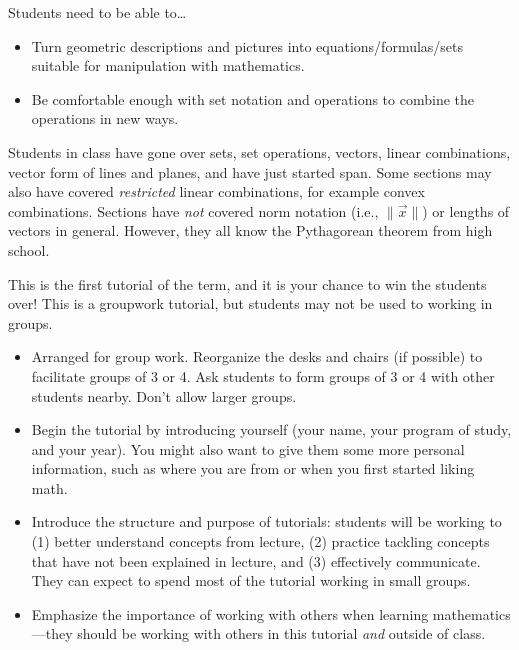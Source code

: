 		 Students need to be able to\ldots
		\begin{itemize}
			\item Turn geometric descriptions and pictures into equations/formulas/sets
				suitable for manipulation with mathematics.

			\item Be comfortable enough with set notation and operations to combine
				the operations in new ways.
		\end{itemize}


		 Students in class have gone over sets, set operations,
		vectors, linear combinations, vector form of lines and planes, and have just started
		span. Some sections may also have covered \emph{restricted} linear combinations, for example
		convex combinations. Sections have \emph{not} covered norm notation (i.e., $\|\vec x\|$) or
		lengths of vectors in general. However, they all know the Pythagorean theorem from high school.


		 This is the first tutorial of the term, and
		it is your chance to win the students over! This is a groupwork tutorial,
		but students may not be used to working in groups.

		\begin{itemize}
			\item Arranged for group work. Reorganize the desks and chairs
				(if possible) to facilitate groups of 3 or 4. Ask
				students to form groups of 3 or 4 with other students
				nearby. Don't allow larger groups.

			\item Begin the tutorial by introducing yourself (your name,
				your program of study, and your year). You might
				also want to give them some more personal information,
				such as where you are from or when you first started liking math.

			\item Introduce the structure and purpose of tutorials: students
				will be working to (1) better understand concepts
				from lecture, (2) practice tackling concepts that
				have not been explained in lecture, and (3) effectively
				communicate. They can expect to spend most of the
				tutorial working in small groups.

			\item Emphasize the importance of working with others when
				learning mathematics---they should be working with
				others in this tutorial \emph{and} outside of
				class.
		\end{itemize}

